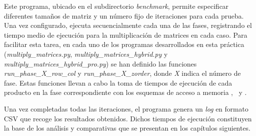 Este programa, ubicado en el subdirectorio \textit{benchmark}, permite especificar diferentes tamaños de matriz y un número fijo de 
iteraciones para cada prueba. Una vez configurado, ejecuta secuencialmente cada una de las fases, registrando el tiempo medio de 
ejecución para la multiplicación de matrices en cada caso. Para facilitar esta tarea, en cada uno de los programas desarrollados en 
esta práctica (\textit{multiply\_matrices.py}, \textit{multiply\_matrices\_hybrid.py} y \textit{multiply\_matrices\_hybrid\_pro.py}) se 
han definido las funciones \textit{run\_phase\_X\_row\_col} y \textit{run\_phase\_X\_zorder}, donde \textit{X} indica el número de fase. 
Estas funciones llevan a cabo la toma de tiempos de ejecución de cada producto en la fase correspondiente con los esquemas de acceso a memoria \rowmajor, \colmajor\ y \zorder.

Una vez completadas todas las iteraciones, el programa genera un \textit{log} en formato CSV que recoge los resultados obtenidos. 
Dichos tiempos de ejecución constituyen la base de los análisis y comparativas que se presentan en los capítulos siguientes.
